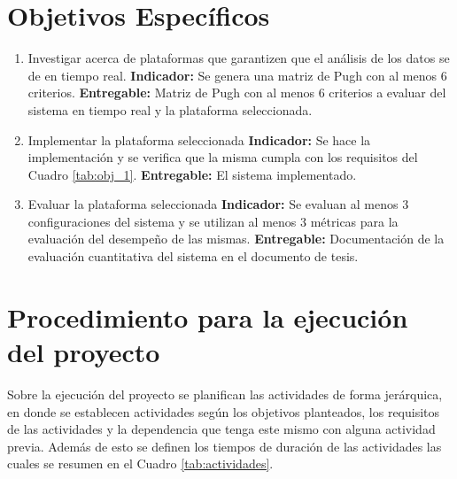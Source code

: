 \documentclass[12pt]{article}
\begin{document}
\section{Objetivos Específicos}

\begin{enumerate}
  \item Investigar acerca de plataformas que garantizen que el análisis de los datos se de en tiempo real. \newline
        \textbf{Indicador:} Se genera una matriz de Pugh con al menos 6 criterios.\newline
        \textbf{Entregable:} Matriz de Pugh con al menos 6 criterios a evaluar del sistema en tiempo real y la plataforma seleccionada.
  \item Implementar la plataforma seleccionada \newline
        \textbf{Indicador:} Se hace la implementación y se verifica que la misma cumpla con los requisitos del Cuadro \ref{tab:obj_1}.\newline
        \textbf{Entregable:} El sistema implementado.
  \item Evaluar la plataforma seleccionada \newline
        \textbf{Indicador:} Se evaluan al menos 3 configuraciones del sistema y se utilizan al menos 3 métricas para la evaluación del desempeño de las mismas.\newline
        \textbf{Entregable:} Documentación de la evaluación cuantitativa del sistema en el documento de tesis.
\end{enumerate}

\section{Procedimiento para la ejecución del proyecto}

Sobre la ejecución del proyecto se planifican las actividades de forma jerárquica, en donde se establecen actividades según los objetivos planteados, los requisitos de las actividades y la dependencia que tenga este mismo con alguna actividad previa. Además de esto se definen los tiempos de duración de las actividades las cuales se resumen en el Cuadro \ref{tab:actividades}.
\end{document}
